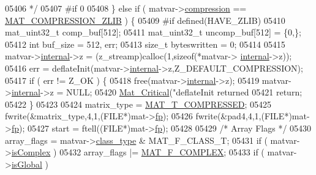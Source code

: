 \begin{DoxyCode}
{{{{{{{{{{{{{{{{{{{{{{{{{{{{{{{05406 \textcolor{comment}{     */}
05407 \textcolor{preprocessor}{#if 0}
05408     \} \textcolor{keywordflow}{else} \textcolor{keywordflow}{if} ( matvar->\hyperlink{group___m_a_t_aeef0466048621cb2c959ba7f6c774d06}{compression} == \hyperlink{group___m_a_t_gga768c318af97bd2567758ecb001ceb7f4a5181d2f71eab0f12f05ba65d4f13fb53}{MAT\_COMPRESSION\_ZLIB} ) \{
05409 \textcolor{preprocessor}{#if defined(HAVE\_ZLIB)}
05410         mat\_uint32\_t comp\_buf[512];
05411         mat\_uint32\_t uncomp\_buf[512] = \{0,\};
05412         \textcolor{keywordtype}{int} buf\_size = 512, err;
05413         \textcolor{keywordtype}{size\_t} byteswritten = 0;
05414 
05415         matvar->\hyperlink{group___m_a_t_a6e97e3ed9f40c49322c18561c2a94e92}{internal}->z = (z\_streamp)calloc(1,\textcolor{keyword}{sizeof}(*matvar->
      \hyperlink{group___m_a_t_a6e97e3ed9f40c49322c18561c2a94e92}{internal}->z));
05416         err = deflateInit(matvar->\hyperlink{group___m_a_t_a6e97e3ed9f40c49322c18561c2a94e92}{internal}->z,Z\_DEFAULT\_COMPRESSION);
05417         \textcolor{keywordflow}{if} ( err != Z\_OK ) \{
05418             free(matvar->\hyperlink{group___m_a_t_a6e97e3ed9f40c49322c18561c2a94e92}{internal}->z);
05419             matvar->\hyperlink{group___m_a_t_a6e97e3ed9f40c49322c18561c2a94e92}{internal}->z = NULL;
05420             \hyperlink{group__mat__util_gaf51f2bfbb5580f575e4dd79757e2b80c}{Mat\_Critical}(\textcolor{stringliteral}{"deflateInit returned %
05421             \textcolor{keywordflow}{return};
05422         \}
05423 
05424         matrix\_type = \hyperlink{group___m_a_t_ggacf7b3b879282b7ab3a51190e49bf3453a30437f2eb3becc2fa6e5d96599d7f724}{MAT\_T\_COMPRESSED};
05425         fwrite(&matrix\_type,4,1,(FILE*)mat->\hyperlink{struct__mat__t_a85f562e407ca9ad4d2a6e14f839432b7}{fp});
05426         fwrite(&pad4,4,1,(FILE*)mat->\hyperlink{struct__mat__t_a85f562e407ca9ad4d2a6e14f839432b7}{fp});
05427         start = ftell((FILE*)mat->\hyperlink{struct__mat__t_a85f562e407ca9ad4d2a6e14f839432b7}{fp});
05428 
05429         \textcolor{comment}{/* Array Flags */}
05430         array\_flags = matvar->\hyperlink{group___m_a_t_aff13035bf3265dd7d9425e5d40c839d4}{class\_type} & MAT\_F\_CLASS\_T;
05431         \textcolor{keywordflow}{if} ( matvar->\hyperlink{group___m_a_t_aeb03b3a69f108dc05470b00443a43739}{isComplex} )
05432             array\_flags |= \hyperlink{group___m_a_t_ggab9d6ef9e3ddca78a317b173f01d53fbbacd7b091a11184aad7fc6078c04470780}{MAT\_F\_COMPLEX};
05433         \textcolor{keywordflow}{if} ( matvar->\hyperlink{group___m_a_t_af26c71c4c0ddb14931d15910dddac1bc}{isGlobal} )
}}}}}}}}}}}}}}}}}}}}}}}}}}}}}}}}
\end{DoxyCode}

